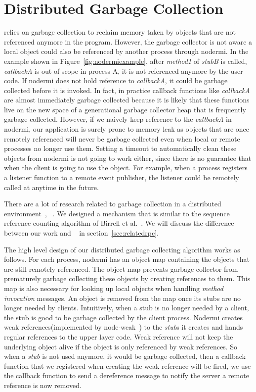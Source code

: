 \section{Distributed Garbage Collection}
\js{} relies on garbage collection to reclaim memory taken by
objects that are not referenced anymore in the program.
However, the garbage collector is not aware a local object
could also be referenced by another process through nodermi.
In the example shown in Figure~\ref{fig:nodermiexample},
after \emph{method1} of \emph{stubB} is called,
\emph{callbackA} is out of scope in process A,
it is not referenced anymore by the user code.
If nodermi does not hold reference to \emph{callbackA},
it could be garbage collected before it is invoked.
In fact, in practice callback functions like \emph{callbackA} are almost
immediately garbage collected because it is likely that these functions
live on the new space of a generational garbage collector heap that is frequently
garbage collected.
However, if we naively keep reference to the \emph{callbackA} in nodermi,
our application is surely prone to memory leak as objects that are once remotely
referenced
will never be garbage collected even when local or remote processes 
no longer use them.
Setting a timeout to automatically clean these objects from nodermi
 is not going to work either,
since there is no guarantee that when the client is going to use the object.
For example,
when a process registers a listener function to a remote event publisher,
the listener could be remotely called at anytime in the future.


There are a lot of research related to garbage collection in a distributed
environment~\cite{abdullahi1998garbage}, ~\cite{birrell1993distributed}.
We designed a mechanism that is similar to the sequence reference counting algorithm
of Birrell et al.~\cite{birrell1993distributed}.
We will discuss the difference between our work and ~\cite{birrell1993distributed}
in section~\ref{sec:relatedrpc}.

The high level design of our distributed garbage collecting 
algorithm works as follows.
For each process, nodermi has an object map containing the objects 
that are still remotely referenced.
The object map prevents garbage collector from prematurely garbage collecting
these objects by creating references to them.
This map is also necessary for looking up local objects 
when handling \emph{method invocation} messages.
An object is removed from the map once its stubs
are no longer needed by clients.
Intuitively,
when a stub is no longer needed by a client,
the stub is good to be garbage collected by the client process.
Nodermi creates weak references(implemented by node-weak~\cite{nodeweak}) 
to the \emph{stub}s it creates
and hands regular references to the upper layer code.
Weak reference will not keep the underlying object alive
if the object is only referenced by weak references.
So when a \emph{stub} is not used anymore,
it would be garbage collected,
then a callback function that we registered when creating the weak
reference will be fired,
we use the callback function to send 
a dereference message to notify the server
a remote reference is now removed.


